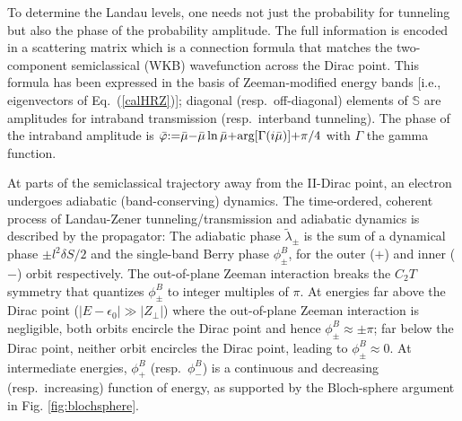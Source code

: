 \documentclass[aps, showpacs, twocolumn, notitlepage, superscriptaddress]{revtex4-1}
\begin{document}
To determine the Landau levels, one needs not just the probability for tunneling but also the phase of the probability amplitude. The full information is encoded in a scattering matrix\cite{AALG,kaganov_coherent_1983}
which is a connection formula that matches the two-component semiclassical (WKB) wavefunction across the Dirac point. This formula  has been expressed in the basis of Zeeman-modified energy bands [i.e., eigenvectors of Eq.\ (\ref{calHRZ})]; diagonal (resp.\ off-diagonal) elements of $\mathbb{S}$ are amplitudes for intraband transmission (resp.\ interband tunneling). The phase of the intraband amplitude is $\bar{\varphi}{:}{=}\bar{\mu}{-}\bar{\mu}\ln\bar{\mu}{+}\text{arg}[\Gamma(i\bar{\mu})]{+}\pi/4$ with $\Gamma$ the gamma function.

At parts of the semiclassical trajectory away from the II-Dirac point, an electron undergoes adiabatic (band-conserving) dynamics. The time-ordered, coherent process of Landau-Zener tunneling/transmission and adiabatic dynamics is described by the propagator:
The adiabatic phase $\tilde{\lambda}_{\pm}$ is the sum of a dynamical phase ${\pm} l^2 \delta S/2$ and  the single-band Berry phase $\phi^B_\pm$, for the outer ($+$) and inner ($-$) orbit respectively. The out-of-plane Zeeman interaction breaks the $C_2T$ symmetry that quantizes $\phi^B_\pm$ to integer multiples of $\pi$. At energies far above the Dirac point ($|E{-}\epsilon_0|{\gg}|Z_{\perp}|$) where the out-of-plane Zeeman interaction is negligible, both orbits encircle the Dirac point and hence $\phi_{\pm}^B{\approx}{\pm}\pi$; far below the Dirac point, neither orbit encircles the Dirac point, leading to $\phi_{\pm}^B{\approx}0$. At intermediate energies, $\phi_{+}^B$ (resp.\ $\phi_{-}^B$) is a continuous and decreasing (resp.\ increasing) function of energy, as supported by the Bloch-sphere argument in Fig. \ref{fig:blochsphere}.
\end{document}
